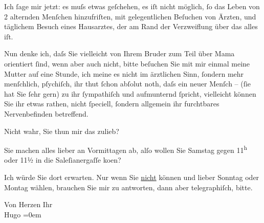 \pstart
           Ich{ }ſage mir jetzt: es muſs {\pb}etwas
               geſchehen, es iſt nicht möglich,{ }ſo das Leben von 2 alternden Menſchen hinzufriſten,
               mit gelegentlichen Beſuchen von Ärzten, und täglichem Besuch eines Hausarztes, der am Rand der
               Verzweiflung über das alles iſt.\pend
           
\pstart
           Nun denke ich, daſs Sie vielleicht von Ihrem Bruder zum Teil über Mama orientiert{ }ſind, wenn aber auch nicht, bitte {\pb}beſuchen Sie mit mir einmal meine
                  Mutter auf eine Stunde,
               ich meine es nicht im ärztlichen Sinn,{ }ſondern mehr menſchlich, pſychiſch, ihr thut{ }ſchon abſolut noth, daſs ein neuer Menſch – (ſie hat Sie{ }ſehr gern) zu ihr{ }ſympathiſch und aufmunternd{ }ſpricht, vielleicht können Sie ihr etwas rathen, nicht{ }ſpeciell,{ }ſondern allgemein ihr furchtbares Nervenbefinden betreffend.\pend
           
\pstart
           Nicht wahr, Sie thun mir {\pb}das
               zulieb?\pend
           
\pstart
           Sie machen alles lieber an Vormittagen ab, alſo wollen Sie Samstag gegen
                     11\textsuperscript{h} oder 11½ in die Saleſianergaſſe ko{\geminationm}en?\pend
           
\pstart
           Ich würde Sie dort erwarten. Nur wenn Sie \uline{nicht}
               können und lieber Sonntag oder Montag wählen, brauchen Sie
               mir zu antworten, dann {\pb}aber
               telegraphiſch, bitte.\pend
           
\pstart
           Von Herzen Ihr{\\[\baselineskip]}\spacefill\mbox{Hugo}\pend
           \leftskip=0em{}\endnumbering{}  \newcommand{\dateiname}{L01380}\newcommand{\titel}{Hugo von Hofmannsthal an Arthur Schnitzler, [9. 3. 1904]}\newcommand{\editorInnen}{Martin Anton Müller und Gerd-Hermann Susen}
